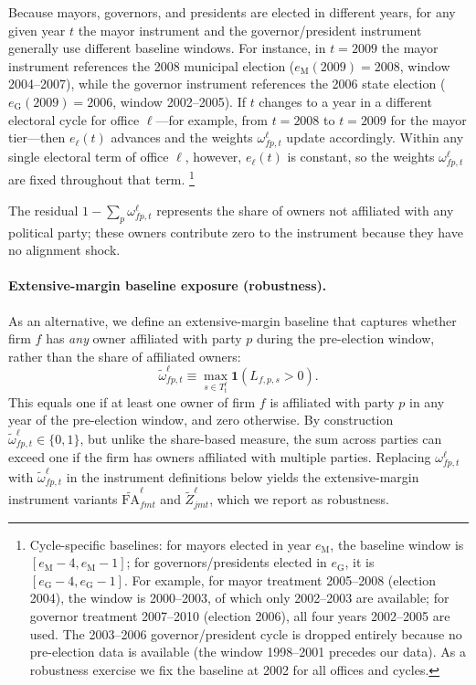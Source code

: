 \documentclass{article}
\newcommand{\FA}{\mathrm{FA}}
\begin{document}
Because mayors, governors, and presidents are elected in different years, for any given year $t$ the mayor instrument and the governor/president instrument generally use different baseline windows. For instance, in $t = 2009$ the mayor instrument references the 2008 municipal election ($e_{\mathrm{M}}(2009) = 2008$, window 2004--2007), while the governor instrument references the 2006 state election ($e_{\mathrm{G}}(2009) = 2006$, window 2002--2005). If $t$ changes to a year in a different electoral cycle for office $\ell$---for example, from $t = 2008$ to $t = 2009$ for the mayor tier---then $e_\ell(t)$ advances and the weights $\omega^\ell_{fp,t}$ update accordingly. Within any single electoral term of office $\ell$, however, $e_\ell(t)$ is constant, so the weights $\omega^\ell_{fp,t}$ are fixed throughout that term.%
\footnote{Cycle-specific baselines: for mayors elected in year $e_{\mathrm{M}}$,
the baseline window is $[e_{\mathrm{M}}-4, e_{\mathrm{M}}-1]$;
for governors/presidents elected in $e_{\mathrm{G}}$, it is $[e_{\mathrm{G}}-4, e_{\mathrm{G}}-1]$.
For example, for mayor treatment 2005--2008 (election 2004),
the window is 2000--2003, of which only 2002--2003 are available;
for governor treatment 2007--2010 (election 2006), all four years 2002--2005 are used.
The 2003--2006 governor/president cycle is dropped entirely
because no pre-election data is available (the window 1998--2001 precedes our data).
As a robustness exercise we fix the baseline at 2002 for all offices and cycles.}

The residual $1 - \sum_p \omega^\ell_{fp,t}$ represents the share of owners
not affiliated with any political party;
these owners contribute zero to the instrument because they have no alignment shock.

\paragraph{Extensive-margin baseline exposure (robustness).}
As an alternative, we define an extensive-margin baseline that captures whether firm $f$ has \emph{any} owner affiliated with party $p$ during the pre-election window, rather than the share of affiliated owners:
\[
  \tilde{\omega}^\ell_{fp,t} \equiv
  \max_{s \in T^\ell_t} \mathbf{1}(L_{f,p,s} > 0).
\]
This equals one if at least one owner of firm $f$ is affiliated with party $p$ in any year of the pre-election window, and zero otherwise. By construction $\tilde{\omega}^\ell_{fp,t} \in \{0,1\}$, but unlike the share-based measure, the sum across parties can exceed one if the firm has owners affiliated with multiple parties. Replacing $\omega^\ell_{fp,t}$ with $\tilde{\omega}^\ell_{fp,t}$ in the instrument definitions below yields the extensive-margin instrument variants $\widetilde{\FA}^{\ell}_{fmt}$ and $\widetilde{Z}^{\ell}_{jmt}$, which we report as robustness.
\end{document}
